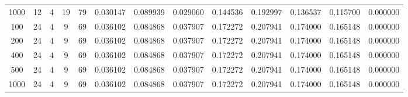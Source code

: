 \begin{table}[h]
\begin{tabular}{ccccccccccccc}
1000 & 12 & 4 & 19 & 79 & 0.030147 & 0.089939 & 0.029060 & 0.144536 & 0.192997 & 0.136537 & 0.115700 & 0.000000 \\
100 & 24 & 4 & 9 & 69 & 0.036102 & 0.084868 & 0.037907 & 0.172272 & 0.207941 & 0.174000 & 0.165148 & 0.000000 \\
200 & 24 & 4 & 9 & 69 & 0.036102 & 0.084868 & 0.037907 & 0.172272 & 0.207941 & 0.174000 & 0.165148 & 0.000000 \\
400 & 24 & 4 & 9 & 69 & 0.036102 & 0.084868 & 0.037907 & 0.172272 & 0.207941 & 0.174000 & 0.165148 & 0.000000 \\
500 & 24 & 4 & 9 & 69 & 0.036102 & 0.084868 & 0.037907 & 0.172272 & 0.207941 & 0.174000 & 0.165148 & 0.000000 \\
1000 & 24 & 4 & 9 & 69 & 0.036102 & 0.084868 & 0.037907 & 0.172272 & 0.207941 & 0.174000 & 0.165148 & 0.000000 \\
\bottomrule
\end{tabular}
\end{table}
